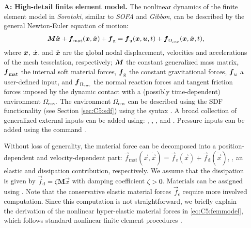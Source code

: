 \textbf{A: High-detail finite element model.} The nonlinear dynamics of the finite element model in \textit{Sorotoki}, similar to \textit{SOFA} and \textit{Gibbon}, can be described by the general Newton-Euler equation of motion:
%
\begin{equation}
    {\boldsymbol{M}} {\ddot{\boldsymbol{x}}} + {\boldsymbol{f}}_\textrm{mat}({\boldsymbol{x}},{\dot{\boldsymbol{x}}}) + {\boldsymbol{f}}_{\scriptstyle\textrm{g}} = {\boldsymbol{f}}_{\textrm{u}}({\boldsymbol{x}},{\boldsymbol{u}},t) + {\boldsymbol{f}}_{\Omega_{\textrm{env}}}({\boldsymbol{x}},{\dot{\boldsymbol{x}}},t),
    \label{eq:C5:femmodel}
\end{equation}
%
where ${\boldsymbol{x}}$, ${\dot{\boldsymbol{x}}}$, and ${\ddot{\boldsymbol{x}}}$ are the global nodal displacement, velocities and accelerations of the mesh tesselation, respectively; ${\boldsymbol{M}}$ the constant generalized mass matrix, ${\boldsymbol{f}}_\textrm{mat}$ the internal soft material forces, ${\boldsymbol{f}}_\textrm{g}$ the constant gravitational forces, ${\boldsymbol{f}}_u$ a user-defined input, and ${\boldsymbol{f}}_{\Omega_{\textrm{env}}}$ the normal reaction forces and tangent friction forces imposed by the dynamic contact with a (possibly time-dependent) environment $\Omega_{\textrm{env}}$. The environment $\Omega_{\textrm{env}}$ can be described using the SDF functionality (see Section \ref{sec:C5:sdf}) using the syntax . A broad collection of generalized external inputs can be added using: , , , and . Pressure inputs can be added using the command . 

Without loss of generality, the material force can be decomposed into a position-dependent and velocity-dependent part: $\vec{f}_{\textrm{mat}}(\vec{x},\dot{\vec{x}}) = \vec{f}_{\textrm{e}}(\vec{x}) + \vec{f}_{\textrm{d}}(\dot{\vec{x}})$, \ie, an elastic and dissipation contribution, respectively. We assume that the dissipation is given by $\vec{f}_{\textrm{d}} = \zeta \mathbf{M} \dot{\vec{x}}$ with damping coefficient $\zeta > 0$. Materials can be assigned using . Note that the conservative elastic material forces $\vec{f}_{\textrm{e}}$ require more involved computation. Since this computation is not straightforward, we briefly explain the derivation of the nonlinear hyper-elastic material forces in \eqref{eq:C5:femmodel}, which follows standard nonlinear finite element procedures \cite{Kim2018,Holzapfel2002,Smith2018}. \\

